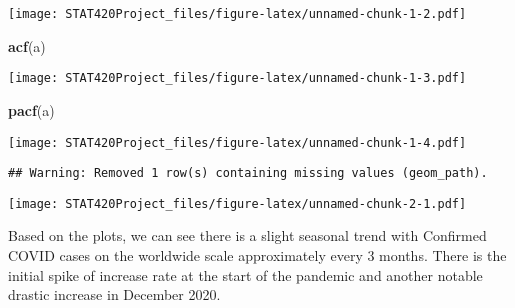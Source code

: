 \documentclass[]{article}
\newenvironment{Shaded}{\begin{snugshade}}{\end{snugshade}}
\newcommand{\CommentTok}[1]{\textcolor[rgb]{0.56,0.35,0.01}{\textit{#1}}}
\newcommand{\DataTypeTok}[1]{\textcolor[rgb]{0.13,0.29,0.53}{#1}}
\newcommand{\DecValTok}[1]{\textcolor[rgb]{0.00,0.00,0.81}{#1}}
\newcommand{\KeywordTok}[1]{\textcolor[rgb]{0.13,0.29,0.53}{\textbf{#1}}}
\newcommand{\NormalTok}[1]{#1}
\newcommand{\OperatorTok}[1]{\textcolor[rgb]{0.81,0.36,0.00}{\textbf{#1}}}
\newcommand{\StringTok}[1]{\textcolor[rgb]{0.31,0.60,0.02}{#1}}
\begin{document}
\texttt{[image: STAT420Project\_files/figure-latex/unnamed-chunk-1-2.pdf]}

\begin{Shaded}
\begin{Highlighting}[]
\KeywordTok{acf}\NormalTok{(a)}
\end{Highlighting}
\end{Shaded}

\texttt{[image: STAT420Project\_files/figure-latex/unnamed-chunk-1-3.pdf]}

\begin{Shaded}
\begin{Highlighting}[]
\KeywordTok{pacf}\NormalTok{(a)}
\end{Highlighting}
\end{Shaded}

\texttt{[image: STAT420Project\_files/figure-latex/unnamed-chunk-1-4.pdf]}

\begin{Shaded}
\end{Shaded}

\begin{Shaded}
\end{Shaded}

\begin{verbatim}
## Warning: Removed 1 row(s) containing missing values (geom_path).
\end{verbatim}

\texttt{[image: STAT420Project\_files/figure-latex/unnamed-chunk-2-1.pdf]}

Based on the plots, we can see there is a slight seasonal trend with
Confirmed COVID cases on the worldwide scale approximately every 3
months. There is the initial spike of increase rate at the start of the
pandemic and another notable drastic increase in December 2020.
\end{document}
